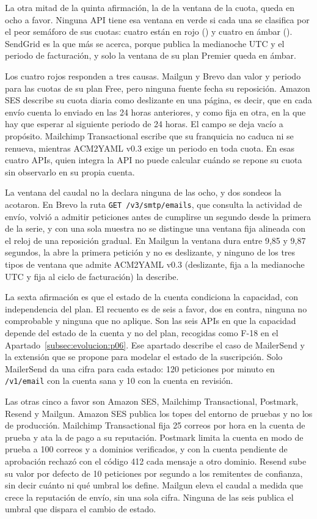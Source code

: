 La otra mitad de la quinta afirmación, la de la ventana de la cuota, queda en ocho a favor.
Ninguna API tiene esa ventana en verde si cada una se clasifica por el peor semáforo de sus cuotas: cuatro están en rojo (\semrojo{}) y cuatro en ámbar (\semambar{}).
SendGrid es la que más se acerca, porque publica la medianoche UTC y el periodo de facturación, y solo la ventana de su plan Premier queda en ámbar.

Los cuatro rojos responden a tres causas.
Mailgun y Brevo dan valor y periodo para las cuotas de su plan Free, pero ninguna fuente fecha su reposición.
Amazon SES describe su cuota diaria como deslizante en una página, es decir, que en cada envío cuenta lo enviado en las 24 horas anteriores, y como fija en otra, en la que hay que esperar al siguiente periodo de 24 horas.
El campo se deja vacío a propósito.
Mailchimp Transactional escribe que su franquicia no caduca ni se renueva, mientras ACM2YAML v0.3 exige un periodo en toda cuota.
En esas cuatro APIs, quien integra la API no puede calcular cuándo se repone su cuota sin observarlo en su propia cuenta.

La ventana del caudal no la declara ninguna de las ocho, y dos sondeos la acotaron.
En Brevo la ruta \texttt{GET /v3/smtp/emails}, que consulta la actividad de envío, volvió a admitir peticiones antes de cumplirse un segundo desde la primera de la serie, y con una sola muestra no se distingue una ventana fija alineada con el reloj de una reposición gradual.
En Mailgun la ventana dura entre 9,85 y 9,87 segundos, la abre la primera petición y no es deslizante, y ninguno de los tres tipos de ventana que admite ACM2YAML v0.3 (deslizante, fija a la medianoche UTC y fija al ciclo de facturación) la describe.

La sexta afirmación es que el estado de la cuenta condiciona la capacidad, con independencia del plan.
El recuento es de seis a favor, dos en contra, ninguna no comprobable y ninguna que no aplique.
Son las seis APIs en que la capacidad depende del estado de la cuenta y no del plan, recogidas como F-18 en el Apartado~\ref{subsec:evolucion:p06}.
Ese apartado describe el caso de MailerSend y la extensión que se propone para modelar el estado de la suscripción.
Solo MailerSend da una cifra para cada estado: 120 peticiones por minuto en \texttt{/v1/email} con la cuenta sana y 10 con la cuenta en revisión.

Las otras cinco a favor son Amazon SES, Mailchimp Transactional, Postmark, Resend y Mailgun.
Amazon SES publica los topes del entorno de pruebas y no los de producción.
Mailchimp Transactional fija 25 correos por hora en la cuenta de prueba y ata la de pago a su reputación.
Postmark limita la cuenta en modo de prueba a 100 correos y a dominios verificados, y con la cuenta pendiente de aprobación rechazó con el código 412 cada mensaje a otro dominio.
Resend sube su valor por defecto de 10 peticiones por segundo a los remitentes de confianza, sin decir cuánto ni qué umbral los define.
Mailgun eleva el caudal a medida que crece la reputación de envío, sin una sola cifra.
Ninguna de las seis publica el umbral que dispara el cambio de estado.

